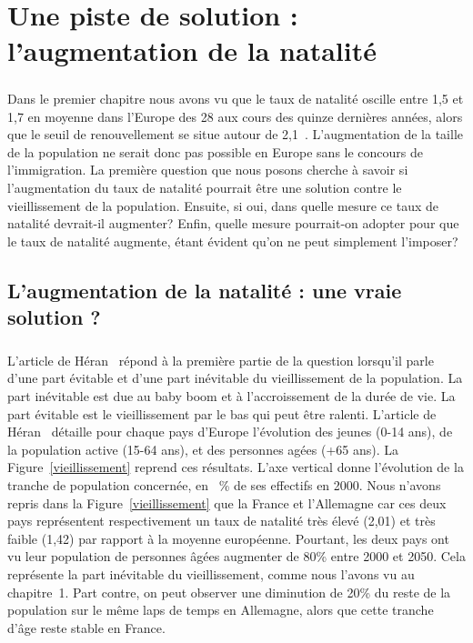 \chapter{Une piste de solution : l'augmentation de la natalité}
\paragraph{}Dans le premier chapitre nous avons vu que le taux de natalité oscille entre 1,5 et 1,7 en moyenne dans l’Europe des 28 aux cours des quinze dernières années, alors que le seuil de renouvellement se situe autour de 2,1~\citep{eur-lex}. L'augmentation de la taille de la population ne serait donc pas possible en Europe sans le concours de l'immigration. La première question que nous posons cherche à savoir si l’augmentation du taux de natalité pourrait être une solution contre le vieillissement de la population. Ensuite, si oui, dans quelle mesure ce taux de natalité devrait-il augmenter? Enfin, quelle mesure pourrait-on adopter pour que le taux de natalité augmente, étant évident qu'on ne peut simplement l'imposer?
\section{L'augmentation de la natalité : une vraie solution ?}
\paragraph{}L’article de Héran~\citep[pp.1]{heran} répond à la première partie de la question lorsqu’il parle d’une part évitable et d’une part inévitable du vieillissement de la population. La part inévitable est due au baby boom et à l’accroissement de la durée de vie. La part évitable est le vieillissement par le bas qui peut être ralenti. L’article de Héran~\citep[pp.5-6]{heran} détaille pour chaque pays d’Europe l’évolution des jeunes (0-14 ans), de la population active (15-64 ans), et des personnes agées (+65 ans). La Figure~\ref{vieillissement} reprend ces résultats. L'axe vertical donne l'évolution de la tranche de population concernée, en ~\% de ses effectifs en 2000. Nous n’avons repris dans la Figure~\ref{vieillissement} que la France et l’Allemagne car ces deux pays représentent respectivement un taux de natalité très élevé (2,01) et très faible (1,42) par rapport à la moyenne européenne. Pourtant, les deux pays ont vu leur population de personnes âgées augmenter de 80\% entre 2000 et 2050. Cela représente la part inévitable du vieillissement, comme nous l'avons vu au chapitre~1. Part contre, on peut observer une diminution de 20\% du reste de la population sur le même laps de temps en Allemagne, alors que cette tranche d'âge reste stable en France. 

